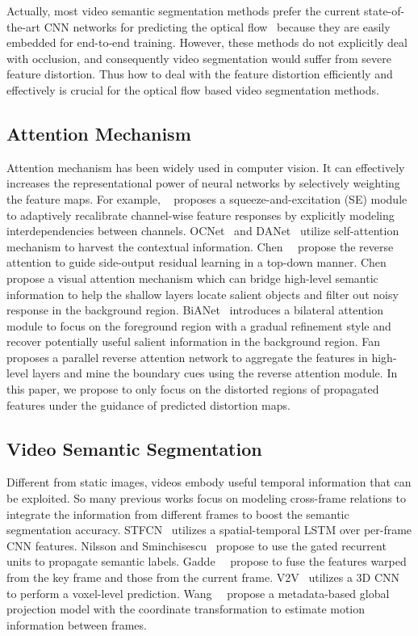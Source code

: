 \documentclass[journal]{IEEEtran}
\begin{document}
Actually,  most video semantic segmentation methods prefer the current state-of-the-art CNN networks for predicting the optical flow~\cite{dosovitskiy2015flownet,ilg2017flownet,sun2018pwc,ranjan2017optical} because they are easily embedded for end-to-end training. However, these methods do not explicitly deal with occlusion, and consequently video segmentation would suffer from severe feature distortion. Thus how to deal with the feature distortion  efficiently and effectively is crucial for the optical flow based video segmentation methods.

\subsection{Attention Mechanism}
Attention mechanism has been widely used in computer vision. It can effectively increases the representational power of neural networks by selectively weighting the feature maps. For example, ~\cite{hu2018squeeze} proposes a squeeze-and-excitation (SE) module to adaptively recalibrate channel-wise feature responses by explicitly modeling interdependencies between channels. OCNet~\cite{yuan2018ocnet} and DANet~\cite{fu2019dual} utilize self-attention mechanism to harvest the contextual information. Chen~\etal~\cite{chen2018reverse} propose the reverse attention to guide side-output residual learning in a top-down manner. Chen~\etal~\cite{chen2018embedding} propose a visual attention mechanism which can bridge high-level semantic information to help the shallow layers locate salient objects and filter out noisy response in the background region. BiANet~\cite{zhang2020bilateral} introduces a bilateral attention module to focus on the foreground region with a gradual refinement style and recover potentially useful salient information in the background region. Fan~\etal~\cite{fan2020pranet} proposes a parallel reverse attention network to aggregate the features in high-level layers and mine the boundary cues using the reverse attention module. In this paper, we propose to only focus on the distorted regions of propagated features under the guidance of predicted distortion maps. 

\subsection{Video Semantic Segmentation}
Different from static images, videos embody useful temporal information that can be exploited.
So many previous works focus on modeling cross-frame relations to integrate the information from different frames to boost the semantic segmentation accuracy. STFCN~\cite{fayyaz2016stfcn} utilizes a spatial-temporal LSTM over per-frame CNN features. Nilsson and Sminchisescu~\cite{nilsson2018semantic} propose to use the gated recurrent units to propagate semantic labels. Gadde~\etal~\cite{gadde2017semantic} propose to fuse the features warped from the key frame and those from the current frame. V2V~\cite{tran2016deep} utilizes a 3D CNN to perform a voxel-level prediction. Wang~\etal~\cite{wang2019superpixel} propose a metadata-based global projection model with the coordinate transformation to estimate motion information between frames.
\end{document}
